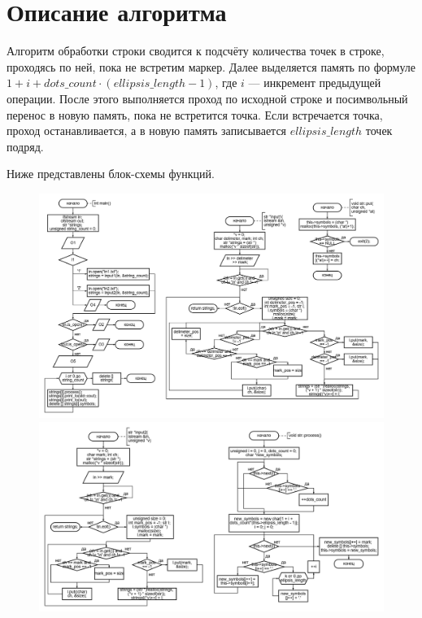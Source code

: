 \documentclass[12pt,a4paper]{extarticle}
\begin{document}
\section{Описание алгоритма}
Алгоритм обработки строки сводится к подсчёту количества точек в строке, проходясь по ней, пока не встретим
маркер. Далее выделяется память по формуле $1 + i + dots\_count\cdot(ellipsis\_length - 1)$, где $i$ --- инкремент
предыдущей операции. После этого выполняется проход по исходной строке и посимвольный перенос в новую память, пока
не встретится точка. Если встречается точка, проход останавливается, а в новую память записывается $ellipsis\_length$
точек подряд.

Ниже представлены блок-схемы функций.
\begin{figure}[h]
    \centering
    \includegraphics[width=0.9\linewidth]{figures/Frame 3.png}
    \includegraphics[width=0.9\linewidth]{figures/Frame 4.png}
\end{figure}
\end{document}
